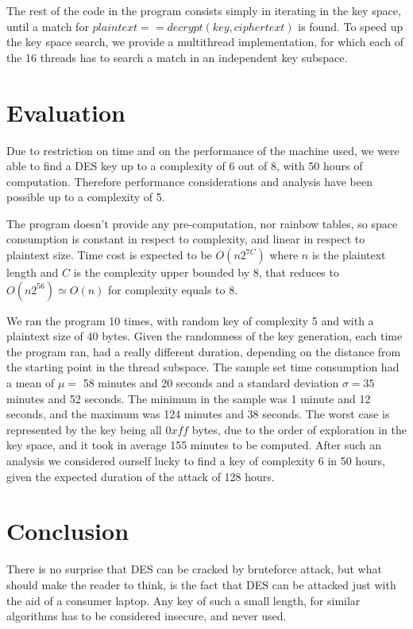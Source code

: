 \documentclass[11pt]{article}
\begin{document}
  The rest of the code in the program consists simply in iterating in the key space, until a match for $plaintext == decrypt(key, ciphertext)$ is found.
  To speed up the key space search, we provide a multithread implementation, for which each of the 16 threads has to search a match in an independent key subspace.

  \section{Evaluation}
  Due to restriction on time and on the performance of the machine used, we were able to find a DES key up to a complexity of 6 out of 8, with 50 hours of computation. Therefore performance considerations and analysis have been possible up to a complexity of 5.

  The program doesn't provide any pre-computation, nor rainbow tables, so space consumption is constant in respect to complexity, and linear in respect to plaintext size.
  Time cost is expected to be $O(n2^{7C})$ where $n$ is the plaintext length and $C$ is the complexity upper bounded by 8, that reduces to $O(n2^{56})\simeq O(n)$ for complexity equals to 8.

  We ran the program 10 times, with random key of complexity 5 and with a plaintext size of 40 bytes. Given the randomness of the key generation, each time the program ran, had a really different duration, depending on the distance from the starting point in the thread subspace. The sample set time consumption had a mean of $\mu =$  58 minutes and 20 seconds and a standard deviation $\sigma = 35$ minutes and 52 seconds. The minimum in the sample was 1 minute and 12 seconds, and the maximum was 124 minutes and 38 seconds. The worst case is represented by the key being all $0xff$ bytes, due to the order of exploration in the key space, and it took in average 155 minutes to be computed. After such an analysis we considered ourself lucky to find a key of complexity 6 in 50 hours, given the expected duration of the attack of 128 hours.

  \section{Conclusion}
  There is no surprise that DES can be cracked by bruteforce attack, but what should make the reader to think, is the fact that DES can be attacked just with the aid of a consumer laptop. Any key of such a small length, for similar algorithms has to be considered insecure, and never used.
\end{document}
